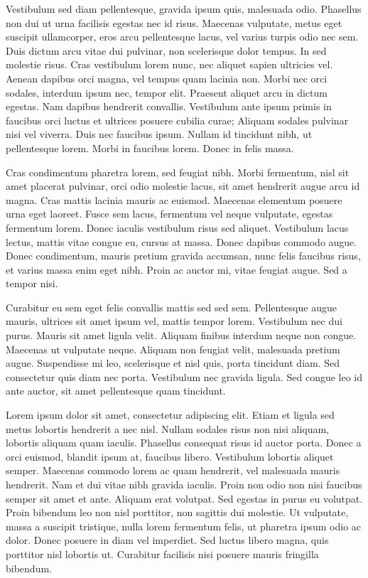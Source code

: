 \documentclass[11pt,twoside]{article}
\begin{document}
Vestibulum sed diam pellentesque, gravida ipsum quis, malesuada odio. Phasellus non dui ut urna facilisis egestas nec id risus. Maecenas vulputate, metus eget suscipit ullamcorper, eros arcu pellentesque lacus, vel varius turpis odio nec sem. Duis dictum arcu vitae dui pulvinar, non scelerisque dolor tempus. In sed molestie risus. Cras vestibulum lorem nunc, nec aliquet sapien ultricies vel. Aenean dapibus orci magna, vel tempus quam lacinia non. Morbi nec orci sodales, interdum ipsum nec, tempor elit. Praesent aliquet arcu in dictum egestas. Nam dapibus hendrerit convallis. Vestibulum ante ipsum primis in faucibus orci luctus et ultrices posuere cubilia curae; Aliquam sodales pulvinar nisi vel viverra. Duis nec faucibus ipsum. Nullam id tincidunt nibh, ut pellentesque lorem. Morbi in faucibus lorem. Donec in felis massa.

Cras condimentum pharetra lorem, sed feugiat nibh. Morbi fermentum, nisl sit amet placerat pulvinar, orci odio molestie lacus, sit amet hendrerit augue arcu id magna. Cras mattis lacinia mauris ac euismod. Maecenas elementum posuere urna eget laoreet. Fusce sem lacus, fermentum vel neque vulputate, egestas fermentum lorem. Donec iaculis vestibulum risus sed aliquet. Vestibulum lacus lectus, mattis vitae congue eu, cursus at massa. Donec dapibus commodo augue. Donec condimentum, mauris pretium gravida accumsan, nunc felis faucibus risus, et varius massa enim eget nibh. Proin ac auctor mi, vitae feugiat augue. Sed a tempor nisi.

Curabitur eu sem eget felis convallis mattis sed sed sem. Pellentesque augue mauris, ultrices sit amet ipsum vel, mattis tempor lorem. Vestibulum nec dui purus. Mauris sit amet ligula velit. Aliquam finibus interdum neque non congue. Maecenas ut vulputate neque. Aliquam non feugiat velit, malesuada pretium augue. Suspendisse mi leo, scelerisque et nisl quis, porta tincidunt diam. Sed consectetur quis diam nec porta. Vestibulum nec gravida ligula. Sed congue leo id ante auctor, sit amet pellentesque quam tincidunt. 



Lorem ipsum dolor sit amet, consectetur adipiscing elit. Etiam et ligula sed metus lobortis hendrerit a nec nisl. Nullam sodales risus non nisi aliquam, lobortis aliquam quam iaculis. Phasellus consequat risus id auctor porta. Donec a orci euismod, blandit ipsum at, faucibus libero. Vestibulum lobortis aliquet semper. Maecenas commodo lorem ac quam hendrerit, vel malesuada mauris hendrerit. Nam et dui vitae nibh gravida iaculis. Proin non odio non nisi faucibus semper sit amet et ante. Aliquam erat volutpat. Sed egestas in purus eu volutpat. Proin bibendum leo non nisl porttitor, non sagittis dui molestie. Ut vulputate, massa a suscipit tristique, nulla lorem fermentum felis, ut pharetra ipsum odio ac dolor. Donec posuere in diam vel imperdiet. Sed luctus libero magna, quis porttitor nisl lobortis ut. Curabitur facilisis nisi posuere mauris fringilla bibendum.
\end{document}
